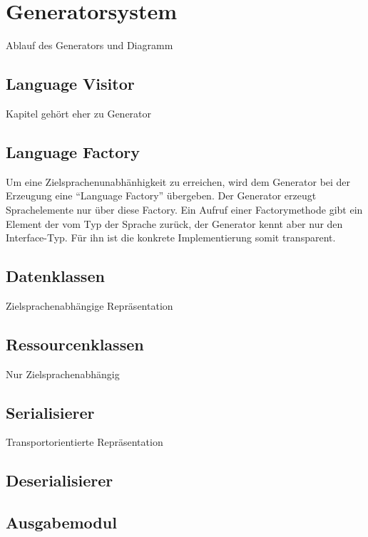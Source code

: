 \section{Generatorsystem}
\label{sec:generatorsystem}

Ablauf des Generators und Diagramm

\subsection{Language Visitor}
\label{sec:language_visitor}

Kapitel gehört eher zu Generator

\subsection{Language Factory}
\label{sec:language_factory}

Um eine Zielsprachenunabhänhigkeit zu erreichen, wird dem Generator bei der Erzeugung eine \enquote{Language Factory} übergeben. Der Generator erzeugt Sprachelemente nur über diese Factory. Ein Aufruf einer Factorymethode gibt ein Element der vom Typ der Sprache zurück, der Generator kennt aber nur den Interface-Typ. Für ihn ist die konkrete Implementierung somit transparent.

\subsection{Datenklassen}
\label{sec:dataclasses}

Zielsprachenabhängige Repräsentation

\subsection{Ressourcenklassen}
\label{sec:ressourceclasses}

Nur Zielsprachenabhängig


\subsection{Serialisierer}
\label{sec:serialiser}

Transportorientierte Repräsentation

\subsection{Deserialisierer}
\label{sec:deserialiser}


\subsection{Ausgabemodul}
\label{sec:printer}
